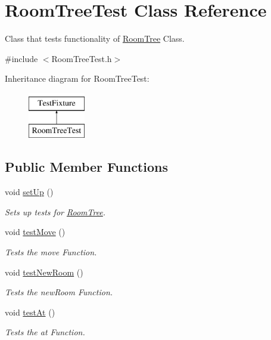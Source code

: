 \hypertarget{classRoomTreeTest}{\section{Room\-Tree\-Test Class Reference}
\label{classRoomTreeTest}
}


Class that tests functionality of \hyperlink{classRoomTree}{Room\-Tree} Class.  




{\ttfamily \#include $<$Room\-Tree\-Test.\-h$>$}

Inheritance diagram for Room\-Tree\-Test\-:\begin{figure}[H]
\begin{center}
\leavevmode
\includegraphics[height=2.000000cm]{classRoomTreeTest}
\end{center}
\end{figure}
\subsection*{Public Member Functions}
\begin{DoxyCompactItemize}
\item 
void \hyperlink{classRoomTreeTest_ae70ed88d72b79d6615705caf5a635aca}{set\-Up} ()
\begin{DoxyCompactList}\small\item\em Sets up tests for \hyperlink{classRoomTree}{Room\-Tree}. \end{DoxyCompactList}\item 
void \hyperlink{classRoomTreeTest_aab3dedfa3aaa0bfab811a8d0d8c8b7e0}{test\-Move} ()
\begin{DoxyCompactList}\small\item\em Tests the move Function. \end{DoxyCompactList}\item 
void \hyperlink{classRoomTreeTest_a1f342a990eb4b60cfae96dac1dbbedee}{test\-New\-Room} ()
\begin{DoxyCompactList}\small\item\em Tests the new\-Room Function. \end{DoxyCompactList}\item 
void \hyperlink{classRoomTreeTest_a7999cf9d9149ade6f39fbb7be601805e}{test\-At} ()
\begin{DoxyCompactList}\small\item\em Tests the at Function. \end{DoxyCompactList}\end{DoxyCompactItemize}
